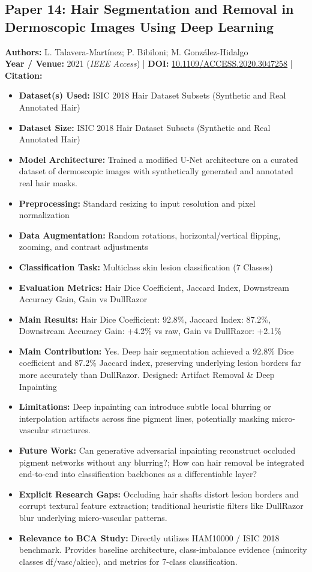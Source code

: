 \documentclass[11pt,a4paper]{article}
\begin{document}
\subsection{Paper 14: Hair Segmentation and Removal in Dermoscopic Images Using Deep Learning}
\textbf{Authors:} L. Talavera-Martínez; P. Bibiloni; M. González-Hidalgo \\
\textbf{Year / Venue:} 2021 (\textit{IEEE Access}) | \textbf{DOI:} \href{https://doi.org/10.1109/ACCESS.2020.3047258}{10.1109/ACCESS.2020.3047258} | \textbf{Citation:} \cite{9306830}

\begin{itemize}\small
\item \textbf{Dataset(s) Used:} ISIC 2018 Hair Dataset Subsets (Synthetic and Real Annotated Hair)
\item \textbf{Dataset Size:} ISIC 2018 Hair Dataset Subsets (Synthetic and Real Annotated Hair)
\item \textbf{Model Architecture:} Trained a modified U-Net architecture on a curated dataset of dermoscopic images with synthetically generated and annotated real hair masks.
\item \textbf{Preprocessing:} Standard resizing to input resolution and pixel normalization
\item \textbf{Data Augmentation:} Random rotations, horizontal/vertical flipping, zooming, and contrast adjustments
\item \textbf{Classification Task:} Multiclass skin lesion classification (7 Classes)
\item \textbf{Evaluation Metrics:} Hair Dice Coefficient, Jaccard Index, Downstream Accuracy Gain, Gain vs DullRazor
\item \textbf{Main Results:} Hair Dice Coefficient: 92.8\%, Jaccard Index: 87.2\%, Downstream Accuracy Gain: +4.2\% vs raw, Gain vs DullRazor: +2.1\%
\item \textbf{Main Contribution:} Yes. Deep hair segmentation achieved a 92.8\% Dice coefficient and 87.2\% Jaccard index, preserving underlying lesion borders far more accurately than DullRazor. Designed: Artifact Removal \& Deep Inpainting
\item \textbf{Limitations:} Deep inpainting can introduce subtle local blurring or interpolation artifacts across fine pigment lines, potentially masking micro-vascular structures.
\item \textbf{Future Work:} Can generative adversarial inpainting reconstruct occluded pigment networks without any blurring?; How can hair removal be integrated end-to-end into classification backbones as a differentiable layer?
\item \textbf{Explicit Research Gaps:} Occluding hair shafts distort lesion borders and corrupt textural feature extraction; traditional heuristic filters like DullRazor blur underlying micro-vascular patterns.
\item \textbf{Relevance to BCA Study:} Directly utilizes HAM10000 / ISIC 2018 benchmark. Provides baseline architecture, class-imbalance evidence (minority classes df/vasc/akiec), and metrics for 7-class classification.
\end{itemize}
\end{document}
